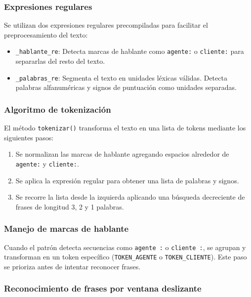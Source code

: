 \subsubsection{Expresiones regulares}

Se utilizan dos expresiones regulares precompiladas para facilitar el preprocesamiento del
texto:

\begin{itemize}
	\item \texttt{\_hablante\_re}: Detecta marcas de hablante como \texttt{agente:} o
	      \texttt{cliente:} para separarlas del resto del texto.

	\item \texttt{\_palabras\_re}: Segmenta el texto en unidades léxicas válidas. Detecta
	      palabras alfanuméricas y signos de puntuación como unidades separadas.
\end{itemize}

\subsubsection{Algoritmo de tokenización}

El método \texttt{tokenizar()} transforma el texto en una lista de tokens mediante los
siguientes pasos:

\begin{enumerate}
	\item Se normalizan las marcas de hablante agregando espacios alrededor de \texttt{agente:}
	      y \texttt{cliente:}.

	\item Se aplica la expresión regular para obtener una lista de palabras y signos.

	\item Se recorre la lista desde la izquierda aplicando una búsqueda decreciente de frases
	      de longitud 3, 2 y 1 palabras.
\end{enumerate}

\subsubsection{Manejo de marcas de hablante}

Cuando el patrón detecta secuencias como \texttt{agente :} o \texttt{cliente :}, se agrupan y
transforman en un token específico (\texttt{TOKEN\_AGENTE} o \texttt{TOKEN\_CLIENTE}). Este
paso se prioriza antes de intentar reconocer frases.

\subsubsection{Reconocimiento de frases por ventana deslizante}

